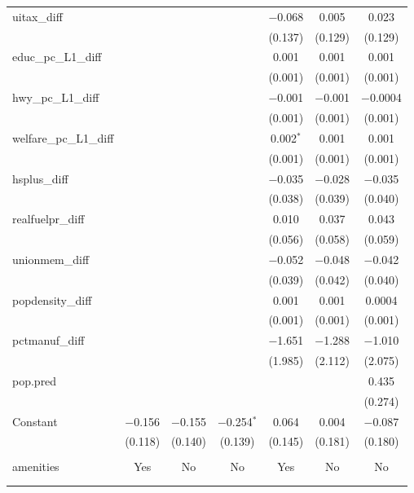 \begin{table}[!htbp]
\begin{tabular}{@{\extracolsep{5pt}}lcccccc}
  uitax\_diff &  &  &  & $-$0.068 & 0.005 & 0.023 \\ 
  &  &  &  & (0.137) & (0.129) & (0.129) \\ 
  educ\_pc\_L1\_diff &  &  &  & 0.001 & 0.001 & 0.001 \\ 
  &  &  &  & (0.001) & (0.001) & (0.001) \\ 
  hwy\_pc\_L1\_diff &  &  &  & $-$0.001 & $-$0.001 & $-$0.0004 \\ 
  &  &  &  & (0.001) & (0.001) & (0.001) \\ 
  welfare\_pc\_L1\_diff &  &  &  & 0.002$^{*}$ & 0.001 & 0.001 \\ 
  &  &  &  & (0.001) & (0.001) & (0.001) \\ 
  hsplus\_diff &  &  &  & $-$0.035 & $-$0.028 & $-$0.035 \\ 
  &  &  &  & (0.038) & (0.039) & (0.040) \\ 
  realfuelpr\_diff &  &  &  & 0.010 & 0.037 & 0.043 \\ 
  &  &  &  & (0.056) & (0.058) & (0.059) \\ 
  unionmem\_diff &  &  &  & $-$0.052 & $-$0.048 & $-$0.042 \\ 
  &  &  &  & (0.039) & (0.042) & (0.040) \\ 
  popdensity\_diff &  &  &  & 0.001 & 0.001 & 0.0004 \\ 
  &  &  &  & (0.001) & (0.001) & (0.001) \\ 
  pctmanuf\_diff &  &  &  & $-$1.651 & $-$1.288 & $-$1.010 \\ 
  &  &  &  & (1.985) & (2.112) & (2.075) \\ 
  pop.pred &  &  &  &  &  & 0.435 \\ 
  &  &  &  &  &  & (0.274) \\ 
  Constant & $-$0.156 & $-$0.155 & $-$0.254$^{*}$ & 0.064 & 0.004 & $-$0.087 \\ 
  & (0.118) & (0.140) & (0.139) & (0.145) & (0.181) & (0.180) \\ 
 \hline \\[-1.8ex] 
amenities & Yes & No & No & Yes & No & No \\ 
\hline \\[-1.8ex] 
\hline 
\hline \\[-1.8ex] 
\end{tabular} 
\end{table} 
